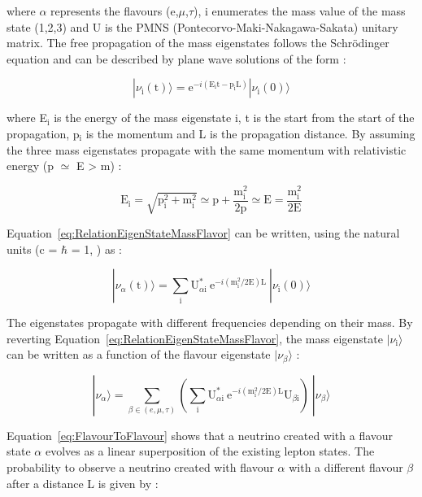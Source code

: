 \documentclass[main.tex]{subfiles}
\begin{document}
\NI where $\alpha$ represents the flavours (e,$\mu$,$\tau$), i enumerates the mass value of the mass state (1,2,3) and U is the PMNS (Pontecorvo-Maki-Nakagawa-Sakata) unitary matrix. The free propagation of the mass eigenstates follows the Schrödinger equation and can be described by plane wave solutions of the form : 


\begin{equation}
|\nu_\text{i} (\text{t}) \rangle = \text{e}^{-i(\text{E}_\text{i}\text{t}-\text{p}_\text{i}\text{L})} |\nu_\text{i} (\text{0}) \rangle
\end{equation}


\NI where E$_\text{i}$ is the energy of the mass eigenstate i, t is the start from the start of the propagation, p$_\text{i}$ is the momentum and L is the propagation distance. By assuming the three mass eigenstates propagate with the same momentum with relativistic energy (p $\simeq$ E > m) : 


\begin{equation}
\text{E}_\text{i} = \sqrt{\text{p}_\text{i}^\text{2} +\text{m}_\text{i}^\text{2}} \simeq \text{p} + \frac{\text{m}_\text{i}^\text{2}}{\text{2p}} \simeq \text{E} = \frac{\text{m}_\text{i}^\text{2}}{\text{2E}}
\end{equation}


\NI Equation~\ref{eq:RelationEigenStateMassFlavor} can be written, using the natural units (c = $\hbar$ = 1, ) as : 


\begin{equation}
|\nu_\alpha (\text{t}) \rangle = \sum_\text{i} \text{U}_{\alpha \text{i}}^*~\text{e}^{-i(\text{m}_\text{i}^\text{2}/\text{2E})\text{L}}~|\nu_\text{i} (\text{0}) \rangle 
\end{equation}


\NI The eigenstates propagate with different frequencies depending on their mass. By reverting Equation~\ref{eq:RelationEigenStateMassFlavor}, the mass eigenstate $|\nu_\text{i} \rangle$ can be written as a function of the flavour eigenstate $|\nu_\beta \rangle$ :  


\begin{equation}\label{eq:FlavourToFlavour}
|\nu_\alpha\rangle  = \sum_{\beta\in(e,\mu,\tau)} \left( \sum_\text{i} \text{U}_{\alpha \text{i}}^*~\text{e}^{-i(\text{m}_\text{i}^\text{2}/\text{2E})\text{L}} \text{U}_{\beta \text{i}} \right)~|\nu_\beta \rangle
\end{equation}


\NI Equation~\ref{eq:FlavourToFlavour} shows that a neutrino created with a flavour state $\alpha$ evolves as a linear superposition of the existing lepton states. The probability to observe a neutrino created with flavour $\alpha$ with a different flavour $\beta$ after a distance L is given by : 
\end{document}
